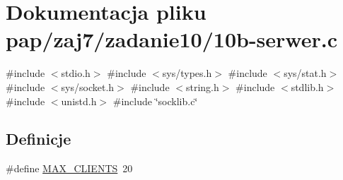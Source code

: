 \hypertarget{10b-serwer_8c}{}\section{Dokumentacja pliku pap/zaj7/zadanie10/10b-\/serwer.c}
\label{10b-serwer_8c}
{\ttfamily \#include $<$stdio.\+h$>$}\newline
{\ttfamily \#include $<$sys/types.\+h$>$}\newline
{\ttfamily \#include $<$sys/stat.\+h$>$}\newline
{\ttfamily \#include $<$sys/socket.\+h$>$}\newline
{\ttfamily \#include $<$string.\+h$>$}\newline
{\ttfamily \#include $<$stdlib.\+h$>$}\newline
{\ttfamily \#include $<$unistd.\+h$>$}\newline
{\ttfamily \#include \char`\"{}socklib.\+c\char`\"{}}\newline
\subsection*{Definicje}
\begin{DoxyCompactItemize}
\item 
\#define \mbox{\hyperlink{10b-serwer_8c_a0a8f91f93d75a07f0ae45077db45b3eb}{M\+A\+X\+\_\+\+C\+L\+I\+E\+N\+TS}}~20
\end{DoxyCompactItemize}
